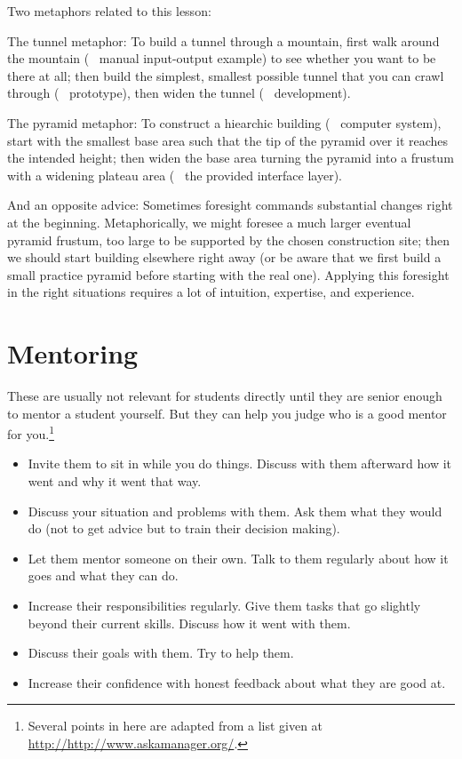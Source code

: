 \documentclass[12pt]{article}
\begin{document}
Two metaphors related to this lesson:
\begin{compactitem}
\item The tunnel metaphor: To build a tunnel through a mountain, first walk around the mountain (~ manual input-output example) to see whether you want to be there at all; then build the simplest, smallest possible tunnel that you can crawl through (~ prototype), then widen the tunnel (~ development).
\item The pyramid metaphor: To construct a hiearchic building (~ computer system), start with the smallest base area such that the tip of the pyramid over it reaches the intended height; then widen the base area turning the pyramid into a frustum with a widening plateau area (~ the provided interface layer).
\end{compactitem}

And an opposite advice: Sometimes foresight commands substantial changes right at the beginning.
Metaphorically, we might foresee a much larger eventual pyramid frustum, too large to be supported by the chosen construction site; then we should start building elsewhere right away (or be aware that we first build a small practice pyramid before starting with the real one).
Applying this foresight in the right situations requires a lot of intuition, expertise, and experience.

\section{Mentoring}

These are usually not relevant for students directly until they are senior enough to mentor a student yourself.
But they can help you judge who is a good mentor for you.\footnote{Several points in here are adapted from a list given at \url{http://http://www.askamanager.org/}.}

\begin{itemize}
\item Invite them to sit in while you do things. Discuss with them afterward how it went and why it went that way.
\item Discuss your situation and problems with them. Ask them what they would do (not to get advice but to train their decision making).
\item Let them mentor someone on their own. Talk to them regularly about how it goes and what they can do.
\item Increase their responsibilities regularly. Give them tasks that go slightly beyond their current skills. Discuss how it went with them.
\item Discuss their goals with them. Try to help them.
\item Increase their confidence with honest feedback about what they are good at.
\end{itemize}
\end{document}

